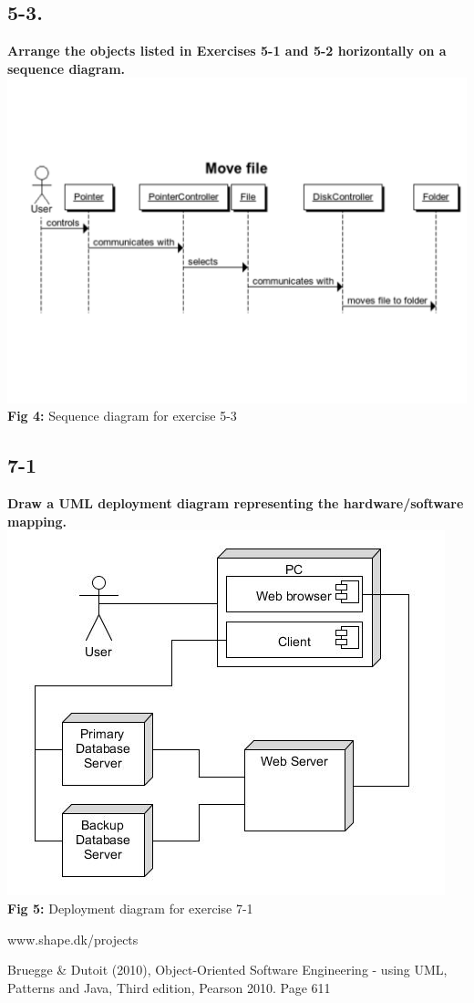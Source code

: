 \documentclass[12pt]{article}
\begin{document}
\newpage
\subsection{5-3.}
\textbf{Arrange the objects listed in Exercises 5-1 and 5-2 horizontally on a sequence diagram.}\\
\includegraphics[scale=0.5]{5-3}\\
\textbf{Fig 4:} Sequence diagram for exercise 5-3


\newpage
\subsection{7-1}
\textbf{Draw a UML deployment diagram representing the hardware/software mapping.}\\

\includegraphics[scale=0.7]{7-1}\\
\textbf{Fig 5:} Deployment diagram for exercise 7-1










\newpage
\begin{thebibliography}{9}

  www.shape.dk/projects
  
Bruegge \& Dutoit (2010), Object-Oriented Software Engineering - using UML, Patterns and
Java, Third edition, Pearson 2010. Page 611 

\end{thebibliography}
\end{document}
